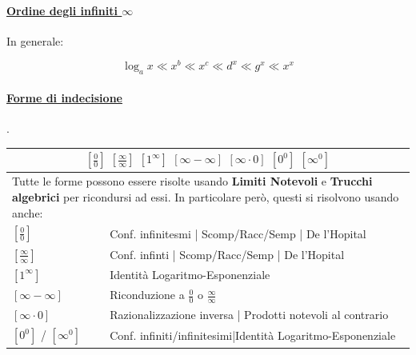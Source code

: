 \documentclass[12pt, a4paper]{article}
\begin{document}
	\paragraph*{\underline{Ordine degli infiniti $\infty$}} In generale:
	\begin{center}
		\[ \log_ax\ll x^b\ll x^c\ll d^x\ll g^x\ll x^x \]
	\end{center}

	\paragraph*{\underline{Forme di indecisione}}.\\
	\begin{tabularx}{\textwidth}{|l|X|}
		\hline
		\multicolumn{2}{|c|}{
			$[\frac{0}{0}]$ $[\frac{\infty}{\infty}]$ $[1^\infty]$ $[\infty - \infty]$ $[\infty \cdot 0]$ $[0^0]$ $[\infty^0]$
		}                                                                                       \\
		\hline
		\multicolumn{2}{|X|}{
			\small{Tutte le forme possono essere risolte usando \textbf{Limiti Notevoli} e \textbf{Trucchi algebrici} per ricondursi ad essi.
				In particolare però, questi si risolvono usando anche:}
		}                                                                                       \\
		\hline
		$[\frac{0}{0}]$           & Conf. infinitesmi | Scomp/Racc/Semp | De l'Hopital          \\
		\hline
		$[\frac{\infty}{\infty}]$ & Conf. infinti | Scomp/Racc/Semp | De l'Hopital              \\
		\hline
		$[1^\infty]$              & Identità Logaritmo-Esponenziale                             \\
		\hline
		$[\infty - \infty]$       & Riconduzione a $\frac{0}{0}$ o $\frac{\infty}{\infty}$      \\
		\hline
		$[\infty \cdot 0]$        & Razionalizzazione inversa | Prodotti notevoli al contrario  \\
		\hline
		$[0^0]$ / $[\infty^0]$    & Conf. infiniti/infinitesimi|Identità Logaritmo-Esponenziale \\
		\hline
	\end{tabularx}
\end{document}
